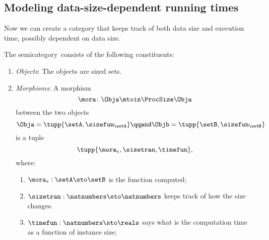 \subsection{Modeling data-size-dependent running times}

Now we can create a category that keeps track of both data size and execution time, possibly dependent on data size.
\begin{definition}
    \label{def:ProcSizeTime}
    The semicategory~\ProcSizeTime consists of the following constituents:
    \begin{enumerate}
        \item \emph{Objects}: The objects are sized sets.
        \item \emph{Morphisms}: A morphism
              \begin{equation}
                  \mora \colon \Obja \mtoin\ProcSize \Obja
              \end{equation}
              between the two objects
              \begin{equation}
                  \Obja = \tupp{\setA, \sizefun_{\setA}}
                  \qqand
                  \Objb = \tupp{\setB, \sizefun_{\setB}}
              \end{equation}
              is a tuple
              \begin{equation}
                  \tupp{\mora_e, \sizetran, \timefun },
              \end{equation}
              where:
              \begin{enumerate}
                  \item $\mora_e : \setA \sto \setB$ is the function computed;
                  \item $\sizetran: \natnumbers \sto \natnumbers$ keeps track of how the size changes.
                  \item $\timefun: \natnumbers \sto \reals$ says what is the computation time as a function of instance size;
              \end{enumerate}


\end{enumerate}
\end{definition}
